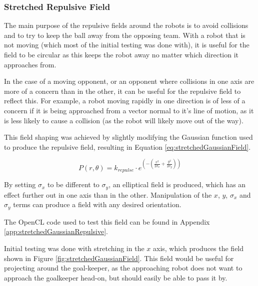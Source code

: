 \documentclass[10pt]{article}
\begin{document}
\subsubsection{Stretched Repulsive Field}

The main purpose of the repulsive fields around the robots is to avoid
collisions and to try to keep the ball away from the opposing team.  With a
robot that is not moving (which most of the initial testing was done with), it
is useful for the field to be circular as this keeps the robot away no matter
which direction it approaches from.

In the case of a moving opponent, or an opponent where collisions in one axis
are more of a concern than in the other, it can be useful for the repulsive
field to reflect this.  For example, a robot moving rapidly in one direction is
of less of a concern if it is being approached from a vector normal to it's line
of motion, as it is less likely to cause a collision (as the robot will likely
move out of the way).

This field shaping was achieved by slightly modifying the Gaussian function used
to produce the repulsive field, resulting in Equation
\ref{eq:stretchedGaussianField}. 

\begin{equation}
P\left(r,\theta\right)=k_{repulse}\cdot
e^{\left(-\left(\frac{x^{2}}{2\sigma_x}+\frac{y^{2}}{2\sigma_y}\right)\right)}\label{eq:stretchedGaussianField}
\end{equation} 

By setting $\sigma_x$ to be different to $\sigma_y$, an elliptical field  is
produced, which has an effect further out in one axis than in the other. 
Manipulation of the $x$, $y$, $\sigma_x$ and $\sigma_y$ terms can produce a
field with any desired orientation.

The OpenCL code used to test this field can be found in Appendix
\ref{app:stretchedGaussianRepulsive}.

Initial testing was done with stretching in the $x$ axis, which produces the
field shown in Figure \ref{fig:stretchedGaussianField}.  This field would be
useful for projecting around the goal-keeper, as the approaching robot does not
want to approach the goalkeeper head-on, but should easily be able to pass it
by.
\end{document}
